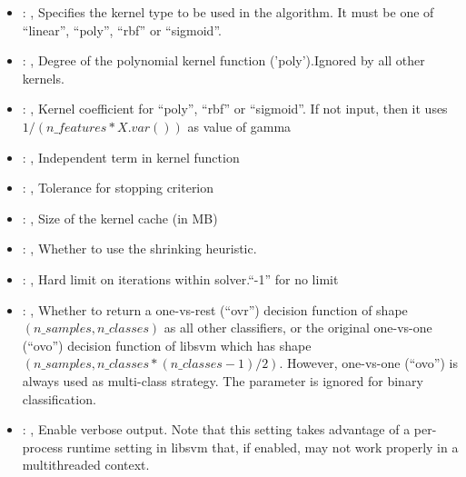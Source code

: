 \begin{itemize}
    \item {}: ,
      Specifies the kernel type to be used in the algorithm. It must be one of
      ``linear'', ``poly'', ``rbf'' or ``sigmoid''.

    \item {}: ,
      Degree of the polynomial kernel function ('poly').Ignored by all other kernels.

    \item {}: ,
      Kernel coefficient for ``poly'', ``rbf'' or ``sigmoid''. If not input, then it uses
      $1 / (n\_features * X.var())$ as value of gamma

    \item {}: ,
      Independent term in kernel function

    \item {}: ,
      Tolerance for stopping criterion

    \item {}: ,
      Size of the kernel cache (in MB)

    \item {}: ,
      Whether to use the shrinking heuristic.

    \item {}: ,
      Hard limit on iterations within solver.``-1'' for no limit

    \item {}: ,
      Whether to return a one-vs-rest (``ovr'') decision function of shape $(n\_samples, n\_classes)$
      as                                                            all other classifiers, or the
      original one-vs-one (``ovo'') decision function of libsvm which has
      shape $(n\_samples, n\_classes * (n\_classes - 1) / 2)$. However, one-vs-one (``ovo'') is always
      used as                                                            multi-class strategy. The
      parameter is ignored for binary classification.

    \item {}: ,
      Enable verbose output. Note that this setting takes advantage
      of a per-process runtime setting in libsvm that, if enabled, may not
      work properly in a multithreaded context.


\end{itemize}
